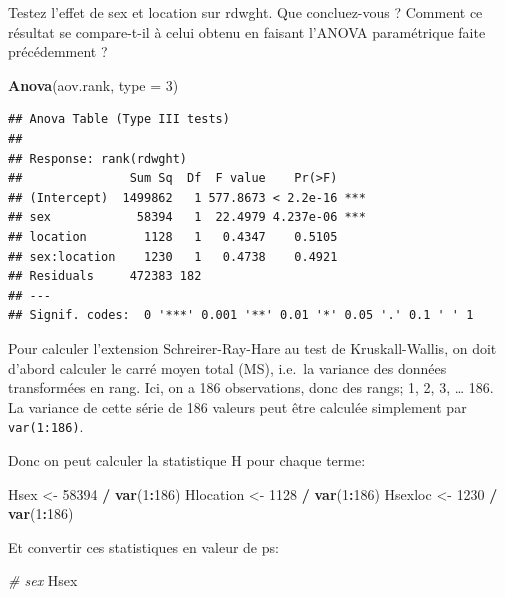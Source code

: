 \documentclass[
  12pt,
]{book}
\newenvironment{Shaded}{\begin{snugshade}}{\end{snugshade}}
\newcommand{\CommentTok}[1]{\textcolor[rgb]{0.56,0.35,0.01}{\textit{#1}}}
\newcommand{\DataTypeTok}[1]{\textcolor[rgb]{0.13,0.29,0.53}{#1}}
\newcommand{\DecValTok}[1]{\textcolor[rgb]{0.00,0.00,0.81}{#1}}
\newcommand{\KeywordTok}[1]{\textcolor[rgb]{0.13,0.29,0.53}{\textbf{#1}}}
\newcommand{\NormalTok}[1]{#1}
\newcommand{\OperatorTok}[1]{\textcolor[rgb]{0.81,0.36,0.00}{\textbf{#1}}}
\newcommand{\StringTok}[1]{\textcolor[rgb]{0.31,0.60,0.02}{#1}}
\begin{document}
Testez l'effet de sex et location sur rdwght. Que concluez-vous ? Comment ce résultat se compare-t-il à celui obtenu en faisant l'ANOVA paramétrique faite précédemment ?

\begin{Shaded}
\begin{Highlighting}[]
\KeywordTok{Anova}\NormalTok{(aov.rank, }\DataTypeTok{type =} \DecValTok{3}\NormalTok{)}
\end{Highlighting}
\end{Shaded}

\begin{verbatim}
## Anova Table (Type III tests)
## 
## Response: rank(rdwght)
##               Sum Sq  Df  F value    Pr(>F)    
## (Intercept)  1499862   1 577.8673 < 2.2e-16 ***
## sex            58394   1  22.4979 4.237e-06 ***
## location        1128   1   0.4347    0.5105    
## sex:location    1230   1   0.4738    0.4921    
## Residuals     472383 182                       
## ---
## Signif. codes:  0 '***' 0.001 '**' 0.01 '*' 0.05 '.' 0.1 ' ' 1
\end{verbatim}

Pour calculer l'extension Schreirer-Ray-Hare au test de Kruskall-Wallis, on doit d'abord calculer le carré moyen total (MS), i.e.~la variance des données transformées en rang. Ici, on a 186 observations, donc des rangs; 1, 2, 3, \ldots{} 186. La variance de cette série de 186 valeurs peut être calculée simplement par \texttt{var(1:186)}.

Donc on peut calculer la statistique H pour chaque terme:

\begin{Shaded}
\begin{Highlighting}[]
\NormalTok{Hsex \textless{}{-}}\StringTok{ }\DecValTok{58394} \OperatorTok{/}\StringTok{ }\KeywordTok{var}\NormalTok{(}\DecValTok{1}\OperatorTok{:}\DecValTok{186}\NormalTok{)}
\NormalTok{Hlocation \textless{}{-}}\StringTok{ }\DecValTok{1128} \OperatorTok{/}\StringTok{ }\KeywordTok{var}\NormalTok{(}\DecValTok{1}\OperatorTok{:}\DecValTok{186}\NormalTok{)}
\NormalTok{Hsexloc \textless{}{-}}\StringTok{ }\DecValTok{1230} \OperatorTok{/}\StringTok{ }\KeywordTok{var}\NormalTok{(}\DecValTok{1}\OperatorTok{:}\DecValTok{186}\NormalTok{)}
\end{Highlighting}
\end{Shaded}

Et convertir ces statistiques en valeur de ps:

\begin{Shaded}
\begin{Highlighting}[]
\CommentTok{\# sex}
\NormalTok{Hsex}
\end{Highlighting}
\end{Shaded}
\end{document}
